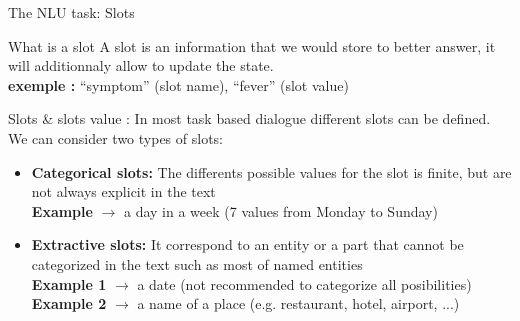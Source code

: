 \documentclass[10pt,aspectratio=169]{beamer}
\begin{document}
\begin{frame}{The NLU task: Slots}
    \begin{block}{What is a slot}
        A slot is an information that we would store to better answer, it will additionnaly allow to update the state.\\ \quad \textbf{exemple :}   ``symptom'' (slot name), ``fever'' (slot value)
    \end{block}
    \begin{block}{Slots \& slots value :}
        In most task based dialogue different slots  can be defined. We can consider two types of slots: 
        \begin{itemize}
            \item \textbf{Categorical slots:} The differents possible values for the slot is finite, but are not always explicit in the text \\
            \quad  \textbf{Example } $\rightarrow$ a day in a week (7 values from Monday to Sunday)
            \item \textbf{Extractive slots:} It correspond to an entity or a part that cannot be categorized in the text such as most of named entities \\
            \quad  \textbf{Example 1} $\rightarrow$ a date (not recommended to categorize all posibilities)
            \\
            \quad  \textbf{Example 2} $\rightarrow$ a name of a place (e.g. restaurant, hotel, airport, ...)
        \end{itemize}
    \end{block}

\end{frame}
\end{document}

